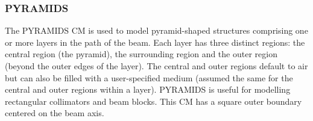 \documentclass[12pt,twoside]{article}
\begin{document}
\begin{small}

\end{small}



\subsubsection{PYRAMIDS}
\renewcommand{\rightmark}{PYRAMIDS CM}
The PYRAMIDS CM is used to model pyramid-shaped structures comprising
one or more layers in the path of
the beam.  Each layer has three distinct regions: the central region
(the pyramid), the
surrounding region and the outer region (beyond the outer edges of the layer).
The central and outer regions default to air but can also be filled
with a user-specified medium (assumed the same for the central and outer
regions within a layer).
PYRAMIDS is useful for modelling rectangular collimators and beam blocks.
This CM has a square outer boundary centered on
the beam axis.

\newpage
\end{document}
